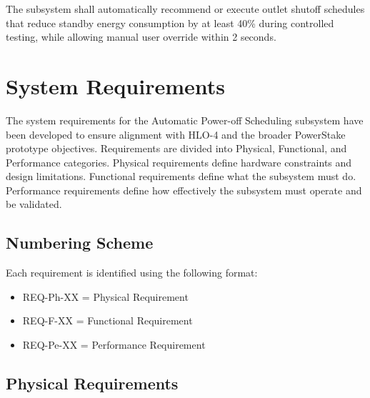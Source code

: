\documentclass[11pt, twoside, a4paper]{article}
\begin{document}
The subsystem shall automatically recommend or execute outlet shutoff schedules that reduce standby energy consumption by at least 40\% during controlled testing, while allowing manual user override within 2 seconds.

\section{System Requirements}


The system requirements for the Automatic Power-off Scheduling subsystem have been developed to ensure alignment with HLO-4 and the broader PowerStake prototype objectives. Requirements are divided into Physical, Functional, and Performance categories. Physical requirements define hardware constraints and design limitations. Functional requirements define what the subsystem must do. Performance requirements define how effectively the subsystem must operate and be validated.

\subsection{Numbering Scheme}

Each requirement is identified using the following format:

\begin{itemize}
    \item REQ-Ph-XX = Physical Requirement
    \item REQ-F-XX = Functional Requirement
    \item REQ-Pe-XX = Performance Requirement
\end{itemize}

\subsection{Physical Requirements}
\end{document}

